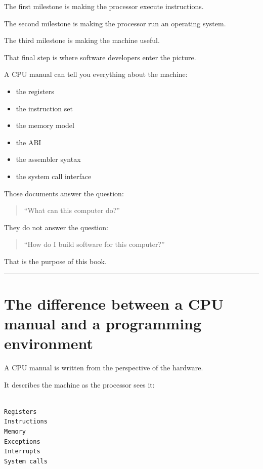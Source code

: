 \documentclass[
  oneside,
  openany]{book}
\providecommand{\tightlist}{%
  \setlength{\itemsep}{0pt}\setlength{\parskip}{0pt}}
\begin{document}
The first milestone is making the processor execute instructions.

The second milestone is making the processor run an operating system.

The third milestone is making the machine useful.

That final step is where software developers enter the picture.

A CPU manual can tell you everything about the machine:

\begin{itemize}
\tightlist
\item
  the registers
\item
  the instruction set
\item
  the memory model
\item
  the ABI
\item
  the assembler syntax
\item
  the system call interface
\end{itemize}

Those documents answer the question:

\begin{quote}
``What can this computer do?''
\end{quote}

They do not answer the question:

\begin{quote}
``How do I build software for this computer?''
\end{quote}

That is the purpose of this book.

\begin{center}\rule{0.5\linewidth}{0.5pt}\end{center}

\hypertarget{the-difference-between-a-cpu-manual-and-a-programming-environment}{%
\section{The difference between a CPU manual and a programming
environment}\label{the-difference-between-a-cpu-manual-and-a-programming-environment}}

A CPU manual is written from the perspective of the hardware.

It describes the machine as the processor sees it:

\begin{verbatim}

Registers
Instructions
Memory
Exceptions
Interrupts
System calls
\end{verbatim}
\end{document}
